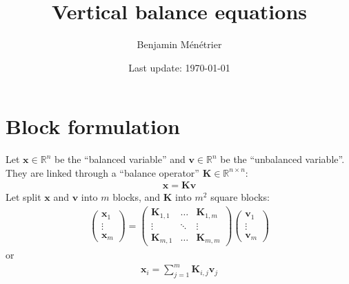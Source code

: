 \documentclass[12pt]{article}
\begin{document}
\title{Vertical balance equations}
\author{Benjamin Ménétrier}
\date{Last update: \today}

\thispagestyle{empty}

\maketitle

\tableofcontents

\clearpage

\section{Block formulation}
Let $\mathbf{x} \in \mathbb{R}^n$ be the ``balanced variable'' and $\mathbf{v} \in \mathbb{R}^n$ be the ``unbalanced variable''. They are linked through a ``balance operator'' $\mathbf{K} \in \mathbb{R}^{n \times n}$:
\begin{align}
\mathbf{x} = \mathbf{K} \mathbf{v}
\end{align}
Let split $\mathbf{x}$ and $\mathbf{v}$ into $m$ blocks, and $\mathbf{K}$ into $m^2$ square blocks:
\begin{align}
\left(\begin{array}{c}
\mathbf{x}_1 \\
\vdots \\
\mathbf{x}_m
\end{array} \right) = \left(\begin{array}{ccc}
\mathbf{K}_{1,1} & \dots & \mathbf{K}_{1,m} \\
\vdots & \ddots & \vdots \\
\mathbf{K}_{m,1} & \dots & \mathbf{K}_{m,m} 
\end{array} \right) \left(\begin{array}{c}
\mathbf{v}_1 \\
\vdots \\
\mathbf{v}_m
\end{array} \right)
\end{align}
or
\begin{align}
\label{eq:full}
\mathbf{x}_i = \sum_{j=1}^m \mathbf{K}_{i,j} \mathbf{v}_j
\end{align}
\end{document}
